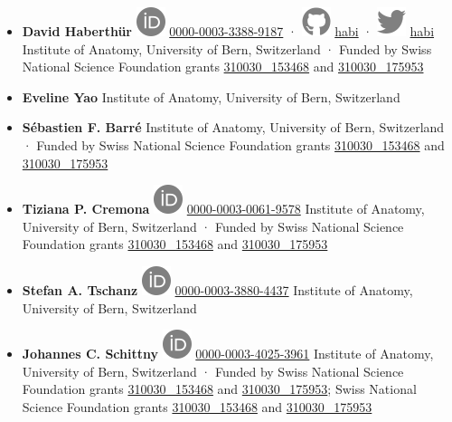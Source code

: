 \documentclass[
  american,
]{article}
\begin{document}
\begin{itemize}
\item
  \textbf{David Haberthür}
  \includegraphics{images/orcid.svg}
  \href{https://orcid.org/0000-0003-3388-9187}{0000-0003-3388-9187}
  · \includegraphics{images/github.svg}
  \href{https://github.com/habi}{habi}
  · \includegraphics{images/twitter.svg}
  \href{https://twitter.com/habi}{habi}
  Institute of Anatomy, University of Bern, Switzerland
  · Funded by Swiss National Science Foundation grants \href{http://p3.snf.ch/project-153468}{310030\_153468} and \href{http://p3.snf.ch/project-175953}{310030\_175953}
\item
  \textbf{Eveline Yao}
  Institute of Anatomy, University of Bern, Switzerland
\item
  \textbf{Sébastien F. Barré}
  Institute of Anatomy, University of Bern, Switzerland
  · Funded by Swiss National Science Foundation grants \href{http://p3.snf.ch/project-153468}{310030\_153468} and \href{http://p3.snf.ch/project-175953}{310030\_175953}
\item
  \textbf{Tiziana P. Cremona}
  \includegraphics{images/orcid.svg}
  \href{https://orcid.org/0000-0003-0061-9578}{0000-0003-0061-9578}
  Institute of Anatomy, University of Bern, Switzerland
  · Funded by Swiss National Science Foundation grants \href{http://p3.snf.ch/project-153468}{310030\_153468} and \href{http://p3.snf.ch/project-175953}{310030\_175953}
\item
  \textbf{Stefan A. Tschanz}
  \includegraphics{images/orcid.svg}
  \href{https://orcid.org/0000-0003-3880-4437}{0000-0003-3880-4437}
  Institute of Anatomy, University of Bern, Switzerland
\item
  \textbf{Johannes C. Schittny}
  \includegraphics{images/orcid.svg}
  \href{https://orcid.org/0000-0003-4025-3961}{0000-0003-4025-3961}
  Institute of Anatomy, University of Bern, Switzerland
  · Funded by Swiss National Science Foundation grants \href{http://p3.snf.ch/project-153468}{310030\_153468} and \href{http://p3.snf.ch/project-175953}{310030\_175953}; Swiss National Science Foundation grants \href{http://p3.snf.ch/project-153468}{310030\_153468} and \href{http://p3.snf.ch/project-175953}{310030\_175953}
\end{itemize}
\end{document}
